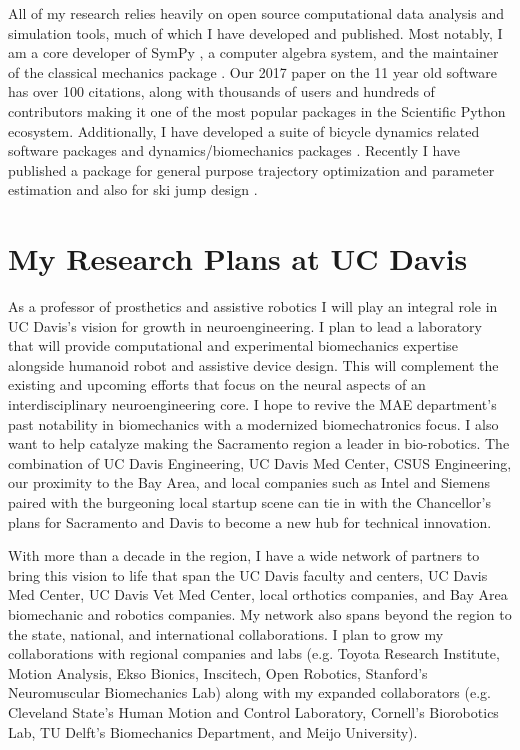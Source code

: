 \documentclass[letter,titlepage]{article}
\begin{document}
All of my research relies heavily on open source computational data analysis
and simulation tools, much of which I have developed and published. Most
notably, I am a core developer of SymPy \cite{SymPyDevelopmentTeam2006}, a computer
algebra system, and the maintainer of the classical mechanics package
\cite{Gede2013}. Our 2017 paper \cite{Meurer2017} on the 11 year old software has over
100 citations, along with thousands of users and hundreds of contributors
making it one of the most popular packages in the Scientific Python ecosystem.
Additionally, I have developed a suite of bicycle dynamics related software
packages \cite{Moore2010b,Moore2011d,Moore2011a,Moore2011e} and
dynamics/biomechanics packages \cite{Dembia2011,Moore2011,Moore2011b,Moore2013b,Moore2017b,Moore2018a}. Recently I have published a package
for general purpose trajectory optimization and parameter estimation
\cite{Moore2018} and also for ski jump design \cite{Moore2018a}.


\section{My Research Plans at UC Davis%
  \label{my-research-plans-at-uc-davis}%
}

As a professor of prosthetics and assistive robotics I will play an integral
role in UC Davis's vision for growth in neuroengineering. I plan to lead a
laboratory that will provide computational and experimental biomechanics
expertise alongside humanoid robot and assistive device design. This will
complement the existing and upcoming efforts that focus on the neural aspects
of an interdisciplinary neuroengineering core. I hope to revive the MAE
department's past notability in biomechanics with a modernized biomechatronics
focus. I also want to help catalyze making the Sacramento region a leader in
bio-robotics. The combination of UC Davis Engineering, UC Davis Med Center,
CSUS Engineering, our proximity to the Bay Area, and local companies such as
Intel and Siemens paired with the burgeoning local startup scene can tie in
with the Chancellor's plans for Sacramento and Davis to become a new hub for
technical innovation.

With more than a decade in the region, I have a wide network of partners to
bring this vision to life that span the UC Davis faculty and centers, UC Davis
Med Center, UC Davis Vet Med Center, local orthotics companies, and Bay Area
biomechanic and robotics companies. My network also spans beyond the region to
the state, national, and international collaborations. I plan to grow my
collaborations with regional companies and labs (e.g. Toyota Research
Institute, Motion Analysis, Ekso Bionics, Inscitech, Open Robotics, Stanford's
Neuromuscular Biomechanics Lab) along with my expanded collaborators (e.g.
Cleveland State's Human Motion and Control Laboratory, Cornell's Biorobotics
Lab, TU Delft's Biomechanics Department, and Meijo University).
\end{document}
